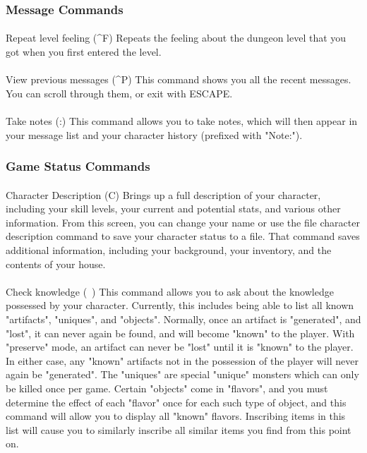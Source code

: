 \subsubsection{Message Commands} 
\paragraph{}Repeat level feeling
(\^{}F) Repeats the feeling about the dungeon level that you got when
you first entered the level.

\paragraph{}View previous messages (\^{}P) This command shows you all
the recent messages. You can scroll through them, or exit with ESCAPE.

\paragraph{}Take notes (:) This command allows you to take notes, which
will then appear in your message list and your character history
(prefixed with "Note:").

\subsubsection{Game Status Commands} 
\paragraph{}Character Description
(C) Brings up a full description of your character, including your skill
levels, your current and potential stats, and various other information.
From this screen, you can change your name or use the file character
description command to save your character status to a file. That
command saves additional information, including your background, your
inventory, and the contents of your house.

\paragraph{}Check knowledge (~) This command allows you to ask about the
knowledge possessed by your character. Currently, this includes being
able to list all known "artifacts", "uniques", and "objects". Normally,
once an artifact is "generated", and "lost", it can never again be
found, and will become "known" to the player. With "preserve" mode, an
artifact can never be "lost" until it is "known" to the player.  In
either case, any "known" artifacts not in the possession of the player
will never again be "generated". The "uniques" are special "unique"
monsters which can only be killed once per game.  Certain "objects" come
in "flavors", and you must determine the effect of each "flavor" once
for each such type of object, and this command will allow you to display
all "known" flavors.  Inscribing items in this list will cause you to
similarly inscribe all similar items you find from this point on.

